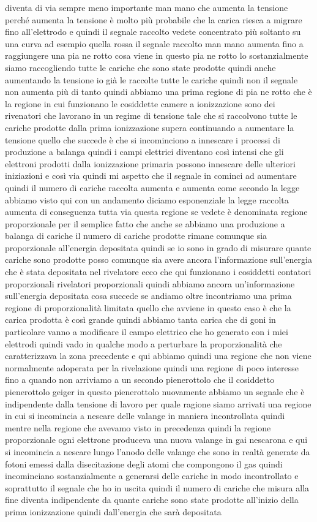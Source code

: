 diventa di via sempre meno importante man mano che aumenta la tensione perché aumenta la tensione è molto più probabile che la carica riesca a migrare fino all'elettrodo e quindi il segnale raccolto vedete concentrato più soltanto su una curva ad esempio quella rossa il segnale raccolto man mano aumenta fino a raggiungere una pia ne rotto cosa viene in questo pia ne rotto lo sostanzialmente siamo raccogliendo tutte le cariche che sono state prodotte quindi anche aumentando la tensione io già le raccolte tutte le cariche quindi non il segnale non aumenta più di tanto quindi abbiamo una prima regione di pia ne rotto che è la regione in cui funzionano le cosiddette camere a ionizzazione sono dei rivenatori che lavorano in un regime di tensione tale che si raccolvono tutte le cariche prodotte dalla prima ionizzazione supera continuando a aumentare la tensione quello che succede è che si incominciono a innescare i processi di produzione a balanga quindi i campi elettrici diventano così intensi che gli elettroni prodotti dalla ionizzazione primaria possono innescare delle ulteriori iniziazioni e così via quindi mi aspetto che il segnale in cominci ad aumentare quindi il numero di cariche raccolta aumenta e aumenta come secondo la legge abbiamo visto qui con un andamento diciamo esponenziale la legge raccolta aumenta di conseguenza tutta via questa regione se vedete è denominata regione proporzionale per il semplice fatto che anche se abbiamo una produzione a balanga di cariche il numero di cariche prodotte rimane comunque sia proporzionale all'energia depositata quindi se io sono in grado di misurare quante cariche sono prodotte posso comunque sia avere ancora l'informazione sull'energia che è stata depositata nel rivelatore ecco che qui funzionano i cosiddetti contatori proporzionali rivelatori proporzionali quindi abbiamo ancora un'informazione sull'energia depositata cosa succede se andiamo oltre incontriamo una prima regione di proporzionalità limitata quello che avviene in questo caso è che la carica prodotta è così grande quindi abbiamo tanta carica che di goni in particolare vanno a modificare il campo elettrico che ho generato con i miei elettrodi quindi vado in qualche modo a perturbare la proporzionalità che caratterizzava la zona precedente e qui abbiamo quindi una regione che non viene normalmente adoperata per la rivelazione quindi una regione di poco interesse fino a quando non arriviamo a un secondo pienerottolo che il cosiddetto pienerottolo geiger in questo pienerottolo nuovamente abbiamo un segnale che è indipendente dalla tensione di lavoro per quale ragione siamo arrivati una regione in cui si incomincia a nescare delle valange in maniera incontrollata quindi mentre nella regione che avevamo visto in precedenza quindi la regione proporzionale ogni elettrone produceva una nuova valange in gai nescarona e qui si incomincia a nescare lungo l'anodo delle valange che sono in realtà generate da fotoni emessi dalla disecitazione degli atomi che compongono il gas quindi incominciano sostanzialmente a generarsi delle cariche in modo incontrollato e soprattutto il segnale che ho in uscita quindi il numero di cariche che misura alla fine diventa indipendente da quante cariche sono state prodotte all'inizio della prima ionizzazione quindi dall'energia che sarà depositata 